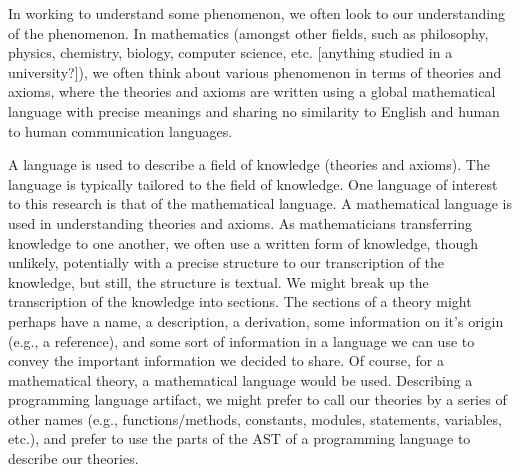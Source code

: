 
In working to understand some phenomenon, we often look to our understanding of
the phenomenon. In mathematics (amongst other fields, such as philosophy,
physics, chemistry, biology, computer science, etc. [anything studied in a
university?]), we often think about various phenomenon in terms of theories and
axioms, where the theories and axioms are written using a global mathematical
language with precise meanings and sharing no similarity to English and human to
human communication languages.

A language is used to describe a field of knowledge (theories and axioms). The
language is typically tailored to the field of knowledge. One language of
interest to this research is that of the mathematical language. A mathematical
language is used in understanding theories and axioms. As mathematicians
transferring knowledge to one another, we often use a written form of knowledge,
though unlikely, potentially with a precise structure to our transcription of
the knowledge, but still, the structure is textual. We might break up the
transcription of the knowledge into sections. The sections of a theory might
perhaps have a name, a description, a derivation, some information on it's
origin (e.g., a reference), and some sort of information in a language we can
use to convey the important information we decided to share. Of course, for a
mathematical theory, a mathematical language would be used. Describing a
programming language artifact, we might prefer to call our theories by a series
of other names (e.g., functions/methods, constants, modules, statements,
variables, etc.), and prefer to use the parts of the AST of a programming
language to describe our theories.


